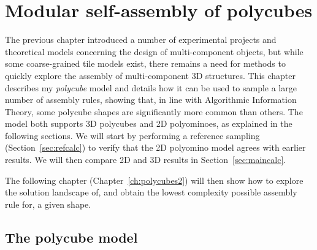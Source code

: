 \chapter{\label{ch:polycubes1}Modular self-assembly of polycubes}

\minitoc

The previous chapter introduced a number of experimental projects and theoretical models concerning the design of multi-component objects, but while some coarse-grained tile models exist, there remains a need for methods to quickly explore the assembly of multi-component 3D structures.
This chapter describes my \emph{polycube} model and details how it can be used to sample a large number of assembly rules, showing that, in line with Algorithmic Information Theory, some polycube shapes are significantly more common than others. The model both supports 3D polycubes and 2D polyominoes, as explained in the following sections. We will start by performing a reference sampling (Section~\ref{sec:refcalc}) to verify that the 2D polyomino model agrees with earlier results. We will then compare 2D and 3D results in Section~\ref{sec:maincalc}.

The following chapter (Chapter~\ref{ch:polycubes2}) will then show how to explore the solution landscape of, and obtain the lowest complexity possible assembly rule for, a given shape.

\section{The polycube model}

